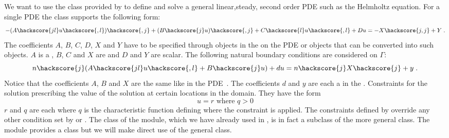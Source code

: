 We want to use the \LinearPDE class provided by \escript to define and solve a general linear,steady, second order PDE such as the 
Helmholtz equation. For a single PDE the \LinearPDE class supports the following form:
\begin{equation}\label{LINEARPDE.SINGLE.1}
-(A\hackscore{jl} u\hackscore{,l})\hackscore{,j}+(B\hackscore{j} u)\hackscore{,j}+C\hackscore{l} u\hackscore{,l}+D u =-X\hackscore{j,j}+Y \; .
\end{equation}
The coefficients $A$, $B$, $C$, $D$, $X$ and $Y$ have to be specified through \Data objects in the 
\Function on the PDE or objects that can be converted into such \Data objects. 
$A$ is a \RankTwo, $B$, $C$ and $X$ are \RankOne and $D$ and $Y$ are scalar. 
The following natural
boundary conditions are considered  on $\Gamma$:
\begin{equation}\label{LINEARPDE.SINGLE.2}
n\hackscore{j}(A\hackscore{jl} u\hackscore{,l}+B\hackscore{j} u)+d u=n\hackscore{j}X\hackscore{j} + y  \;.
\end{equation}
Notice that the coefficients $A$, $B$ and $X$ are the same like in the PDE~. The coefficients $d$ and $y$ are  
each a \Scalar in the \FunctionOnBoundary.  Constraints  for the solution prescribing the value of the 
solution at certain locations in the domain. They have the form
\begin{equation}\label{LINEARPDE.SINGLE.3}
u=r \mbox{ where } q>0
\end{equation}
$r$ and $q$ are each \Scalar where $q$ is the characteristic function
 defining where the constraint is applied.
The constraints defined by  override any other condition set by 
or . 
The \Poisson class of the \linearPDEs module,
which we have already used in , is in fact a subclass of the more general
\LinearPDE class. The \linearPDEs module provides a \Helmholtz class but
we will make direct use of the general \LinearPDE class.

